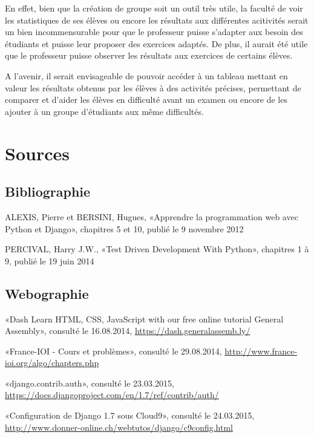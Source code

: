 \documentclass[a4paper,10pt,french]{sphinxmanual}
\begin{document}
En effet, bien que la création de groupe soit un outil très utile, la faculté
de voir les statistiques de ses élèves ou encore les résultats aux différentes
acitivités serait un bien incommensurable pour que le professeur puisse
s'adapter aux besoin des étudiants et puisse leur proposer des exercices
adaptés. De plus, il aurait été utile que le professeur puisse observer les
résultats aux exercices de certains élèves.

A l'avenir, il serait envisageable de pouvoir accéder à un tableau mettant
en valeur les résultats obtenus par les élèves à des activités précises,
permettant de comparer et d'aider les élèves en difficulté avant un examen
ou encore de les ajouter à un groupe d'étudiants aux même difficultés.


\chapter{Sources}
\label{source:sources}\label{source::doc}

\section{Bibliographie}
\label{source:bibliographie}
ALEXIS, Pierre et BERSINI, Hugues, «Apprendre la programmation web avec Python
et Django», chapitres 5 et 10, publié le 9 novembre 2012

PERCIVAL, Harry J.W., «Test Driven Development With Python», chapitres 1 à 9,
publié le 19 juin 2014


\section{Webographie}
\label{source:webographie}
«Dash \textbar{} Learn HTML, CSS, JavaScript with our free online tutorial \textbar{} General
Assembly»,
consulté le 16.08.2014,
\href{https://dash.generalassemb.ly/}{https://dash.generalassemb.ly/}

«France-IOI - Cours et problèmes»,
consulté le 29.08.2014,
\href{http://www.france-ioi.org/algo/chapters.php}{http://www.france-ioi.org/algo/chapters.php}

«django.contrib.auth»,
consulté le 23.03.2015,
\href{https://docs.djangoproject.com/en/1.7/ref/contrib/auth/}{https://docs.djangoproject.com/en/1.7/ref/contrib/auth/}

«Configuration de Django 1.7 sous Cloud9»,
consulté le 24.03.2015,
\href{http://www.donner-online.ch/webtutos/django/c9config.html}{http://www.donner-online.ch/webtutos/django/c9config.html}
\end{document}
